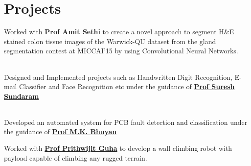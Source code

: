 \documentclass[]{resume}
\begin{document}
\begin{minipage}[t]{0.66\textwidth}

\section{Projects}
Worked with \textbf{\href{http://www.iitg.ernet.in/eee/amitsethi.html}{Prof Amit Sethi}} to create a novel approach to segment H\&E stained colon tissue images of the Warwick-QU dataset from the gland segmentation contest at MICCAI'15 by using Convolutional Neural Networks.
\sectionsep

\\
Designed and Implemented projects such as Handwritten Digit Recognition, E-mail Classifier and Face Recognition etc under the guidance of \textbf{\href{http://www.iitg.ernet.in/eee/suresh.html}{Prof Suresh Sundaram}}
\sectionsep

\\
Developed an automated system for PCB fault detection and classification under the guidance of \textbf{\href{http://www.iitg.ernet.in/eee/mkb.html}{Prof M.K. Bhuyan}} 
\sectionsep

Worked with \textbf{\href{http://www.iitg.ernet.in/eee/pguha.html}{Prof Prithwijit Guha}} to develop a wall climbing robot with payload capable of climbing any rugged terrain.
\sectionsep



\end{minipage}
\end{document}
